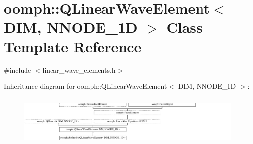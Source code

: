 \hypertarget{classoomph_1_1QLinearWaveElement}{}\section{oomph\+:\+:Q\+Linear\+Wave\+Element$<$ D\+IM, N\+N\+O\+D\+E\+\_\+1D $>$ Class Template Reference}
\label{classoomph_1_1QLinearWaveElement}


{\ttfamily \#include $<$linear\+\_\+wave\+\_\+elements.\+h$>$}

Inheritance diagram for oomph\+:\+:Q\+Linear\+Wave\+Element$<$ D\+IM, N\+N\+O\+D\+E\+\_\+1D $>$\+:\begin{figure}[H]
\begin{center}
\leavevmode
\includegraphics[height=2.529359cm]{classoomph_1_1QLinearWaveElement}
\end{center}
\end{figure}
